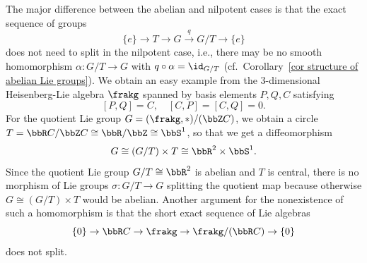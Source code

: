 \begin{rem}
    The major difference between the abelian and nilpotent cases is that the exact sequence of groups 
    \[\{e\}\to T\to G\overset{q}{\to}G\slash T\to \{e\}\]
    does not need to split in the nilpotent case, i.e., there may be no smooth homomorphism $\alpha:G\slash T\to G$ with $q\circ\alpha=\id_{G\slash T}$ (cf.\ Corollary~\ref{cor structure of abelian Lie groups}). We obtain an easy example from the $3$-dimensional Heisenberg-Lie algebra $\frakg$ spanned by basis elements $P,Q,C$ satisfying 
    \[[P,Q]=C,\quad [C,P]=[C,Q]=0.\]
    For the quotient Lie group $G=(\frakg,\ast)\slash (\bbZ C)$, we obtain a circle $T=\bbR C\slash\bbZ C\cong \bbR\slash\bbZ\cong\bbS^1$, so that we get a diffeomorphism 
    \[G\cong (G\slash T)\times T\cong \bbR^2\times \bbS^1.\]
    Since the quotient Lie group $G\slash T\cong\bbR^2$ is abelian and $T$ is central, there is no morphism of Lie groups $\sigma:G\slash T\to G$ splitting the quotient map because otherwise $G\cong(G\slash T)\times T$ would be abelian. Another argument for the nonexistence of such a homomorphism is that the short exact sequence of Lie algebras 
    \[\{0\}\to \bbR C\to \frakg\to \frakg\slash(\bbR C)\to \{0\}\]
    does not split.
\end{rem}

